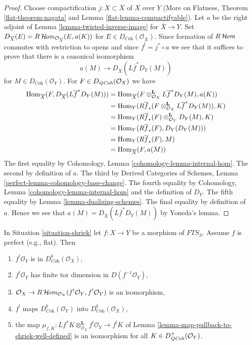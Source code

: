\begin{proof}
Choose compactification $j : X \subset \overline{X}$ of $X$ over $Y$
(More on Flatness, Theorem \ref{flat-theorem-nagata} and
Lemma \ref{flat-lemma-compactifyable}). Let $a$ be the
right adjoint of Lemma \ref{lemma-twisted-inverse-image} for
$\overline{X} \to Y$. Set
$D_{\overline{X}}(E) = R\mathop{\mathcal{H}\!\mathit{om}}\nolimits_{\mathcal{O}_{\overline{X}}}(E, a(K))$
for $E \in D_{\textit{Coh}}(\mathcal{O}_{\overline{X}})$.
Since formation of $R\mathop{\mathcal{H}\!\mathit{om}}\nolimits$ commutes with restriction to opens
and since $f^! = j^* \circ a$ we see that it suffices to prove that
there is a canonical isomorphism
$$
a(M) \longrightarrow D_{\overline{X}}(L\overline{f}^*D_Y(M))
$$
for $M \in D_{\textit{Coh}}(\mathcal{O}_Y)$. For
$F \in D_{\mathit{QCoh}}(\mathcal{O}_X)$ we have
\begin{align*}
\mathop{\mathrm{Hom}}\nolimits_{\overline{X}}(
F, D_{\overline{X}}(L\overline{f}^*D_Y(M)))
& =
\mathop{\mathrm{Hom}}\nolimits_{\overline{X}}(
F \otimes_{\mathcal{O}_X}^\mathbf{L} L\overline{f}^*D_Y(M), a(K)) \\
& =
\mathop{\mathrm{Hom}}\nolimits_Y(
R\overline{f}_*(F \otimes_{\mathcal{O}_X}^\mathbf{L} L\overline{f}^*D_Y(M)),
K) \\
& =
\mathop{\mathrm{Hom}}\nolimits_Y(
R\overline{f}_*(F) \otimes_{\mathcal{O}_Y}^\mathbf{L} D_Y(M),
K) \\
& =
\mathop{\mathrm{Hom}}\nolimits_Y(
R\overline{f}_*(F), D_Y(D_Y(M))) \\
& =
\mathop{\mathrm{Hom}}\nolimits_Y(R\overline{f}_*(F), M) \\
& = \mathop{\mathrm{Hom}}\nolimits_{\overline{X}}(F, a(M))
\end{align*}
The first equality by Cohomology, Lemma \ref{cohomology-lemma-internal-hom}.
The second by definition of $a$.
The third by Derived Categories of Schemes, Lemma
\ref{perfect-lemma-cohomology-base-change}.
The fourth equality by Cohomology, Lemma \ref{cohomology-lemma-internal-hom}
and the definition of $D_Y$.
The fifth equality by Lemma \ref{lemma-dualizing-schemes}.
The final equality by definition of $a$.
Hence we see that $a(M) = D_{\overline{X}}(L\overline{f}^*D_Y(M))$
by Yoneda's lemma.
\end{proof}

\begin{lemma}
\label{lemma-perfect-comparison-shriek}
In Situation \ref{situation-shriek} let $f : X \to Y$ be a morphism of
$\textit{FTS}_S$. Assume $f$ is perfect (e.g., flat). Then
\begin{enumerate}
\item[(a)] $f^!\mathcal{O}_Y$ is in $D_{\textit{Coh}}^b(\mathcal{O}_X)$,
\item[(b)] $f^!\mathcal{O}_Y$ has finite tor dimension in
$D(f^{-1}\mathcal{O}_Y)$,
\item[(c)] $\mathcal{O}_X \to
R\mathop{\mathcal{H}\!\mathit{om}}\nolimits_{\mathcal{O}_X}(f^!\mathcal{O}_Y, f^!\mathcal{O}_Y)$
is an isomorphism,
\item[(d)] $f^!$ maps $D_{\textit{Coh}}^b(\mathcal{O}_Y)$ into
$D_{\textit{Coh}}^b(\mathcal{O}_X)$,
\item[(e)] the map
$\mu_{f,  K} :
Lf^*K \otimes_{\mathcal{O}_X}^\mathbf{L} f^!\mathcal{O}_Y
\to
f^!K$
of Lemma \ref{lemma-map-pullback-to-shriek-well-defined}
is an isomorphism for all $K \in D_{\mathit{QCoh}}^+(\mathcal{O}_Y)$.
\end{enumerate}
\end{lemma}

